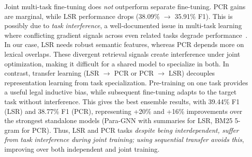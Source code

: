 \noindent Joint multi-task fine-tuning does \textit{not} outperform separate fine-tuning. PCR gains are marginal, while LSR performance drops (38.09\% $\rightarrow$ 35.91\% F1). This is possibly due to \textit{task interference}, a well-documented issue in multi-task learning where conflicting gradient signals across even related tasks degrade performance~\citep{mueller-etal-2022-text2text,ni-etal-2023-multitask}. 
In our case, LSR needs robust semantic features, whereas PCR depends more on lexical overlaps. These divergent retrieval signals create interference under joint optimization, making it difficult for a shared model to specialize in both.  
In contrast, transfer learning (LSR $\rightarrow$ PCR or PCR $\rightarrow$ LSR) decouples representation learning from task specialization. Pre-training on one task provides a useful legal inductive bias, while subsequent fine-tuning adapts to the target task without interference. This gives the best ensemble results, with 39.44\% F1 (LSR) and 38.77\% F1 (PCR), representing +20\% and +16\% improvements over the strongest standalone models (Para-GNN with summaries for LSR, BM25 5-gram for PCR).  
Thus, LSR and PCR tasks \textit{despite being interdependent, suffer from task interference during joint training; using sequential transfer avoids this}, improving over both independent and joint training.

